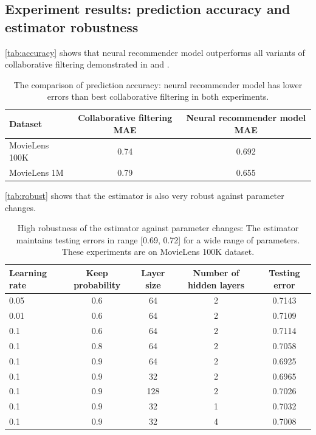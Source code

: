\documentclass{article}
\begin{document}
\subsection{Experiment results: prediction accuracy and estimator robustness}
\autoref{tab:accuracy} shows that neural recommender model outperforms all 
variants of collaborative filtering demonstrated in \cite{hwang2016efficient} 
and \cite{polatidis2016multi}.
\begin{table}[h]
	\centering
	\caption{The comparison of prediction accuracy: neural recommender model 
	has lower errors than best collaborative filtering in both experiments.}
	\begin{tabularx}{\textwidth}{ |X|c|c| }  \hline
		\textbf{Dataset} & \textbf{Collaborative filtering MAE} & 
		\textbf{Neural recommender model MAE} \\ \hline
		MovieLens 100K & 0.74 & 0.692 \\ \hline
		MovieLens 1M & 0.79 & 0.655 \\ \hline
	\end{tabularx}
	\label{tab:accuracy}
\end{table}
\autoref{tab:robust} shows that the estimator is also very robust against 
parameter changes.
\begin{table}[h]
	\centering
	\caption{High robustness of the estimator against parameter changes: 
		The estimator maintains testing errors in range [0.69, 0.72] for a wide 
		range of parameters. These experiments are on MovieLens 100K dataset.}
	\begin{tabularx}{\textwidth}{ |X|c|c|c|c| }  \hline
		 \textbf{Learning rate} & \textbf{Keep probability} & \textbf{Layer 
		 size} & \textbf{Number of hidden layers} & \textbf{Testing error} \\ 
		 \hline
		 0.05 & 0.6 & 64 & 2 & 0.7143 \\ \hline
		 0.01 & 0.6 & 64 & 2 & 0.7109 \\ \hline
		 0.1 & 0.6 & 64 & 2 & 0.7114 \\ \hline
		 0.1 & 0.8 & 64 & 2 & 0.7058 \\ \hline
		 0.1 & 0.9 & 64 & 2 & 0.6925 \\ \hline
		 0.1 & 0.9 & 32 & 2 & 0.6965 \\ \hline
		 0.1 & 0.9 & 128 & 2 & 0.7026 \\ \hline
		 0.1 & 0.9 & 32 & 1 & 0.7032 \\ \hline
		 0.1 & 0.9 & 32 & 4 & 0.7008 \\ \hline
	\end{tabularx}
	\label{tab:robust}
\end{table}
\end{document}
